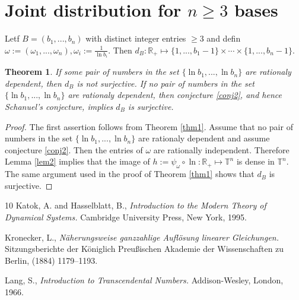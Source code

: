 \documentclass[14pt, twoside, a4paper]{article} %
\newtheorem{theo}{Theorem}                                                 %
\newtheorem{proof}{Proof}                                              %
\begin{document}
\section{Joint distribution for $n \geq 3$ bases}\label{sec4}
%
Letf $B = (b_1,...,b_n)$ with distinct integer entries $\geq 3$ 
and defin $\omega := (\omega_1,...,\omega_n), \omega_i := \frac{1}{\ln b_i}.$ Then 
%
$
d_B : \mathbb R_+ \mapsto \{1,...,b_1-1\} \times \cdots \times \{1,...,b_n-1\}.
$
%
\begin{theo}\label{thm2}
If some pair of numbers in the set $\{\ln b_1,...,\ln b_n\}$ 
are rationaly dependent, then  $d_B$ is not surjective. 
If no pair of numbers in the set $\{\ln b_1,...,\ln b_n\}$ 
are rationaly dependent, then 
conjecture \ref{conj2}, and hence  Schanuel's conjecture, implies $d_B$ is surjective.
\end{theo}
\begin{proof}
The first assertion follows from Theorem \ref{thm1}. Assume that no pair of numbers in the set 
$\{\ln b_1,...,\ln b_n\}$ 
are rationaly dependent and assume conjecture \ref{conj2}. 
Then the entries of 
$\omega$ are rationally independent. Therefore 
Lemma \ref{lem2} implies that the image of
$h := \psi_\omega \circ \ln : \mathbb R_+ 
\mapsto \mathbb T^n$ is dense in 
$\mathbb T^n.$ 
The same argument used in the proof
of Theorem \ref{thm1} shows that
$d_B$ is surjective.
\end{proof}
%
\begin{thebibliography}{10}
 Katok, A. and 
Hasselblatt, B., {\it Introduction to the Modern Theory of Dynamical Systems.} Cambridge University Press, New York, 1995.

 Kronecker, L., 
{\it N\"{a}herungsweise ganzzahlige Aufl\"{o}sung linearer Gleichungen.} Sitzungsberichte der K\"{o}niglich Preußischen Akademie der Wissenschaften zu Berlin, (1884) 1179--1193.

 Lang, S., {\it Introduction to Transcendental Numbers.} Addison-Wesley, London, 1966.
\end{thebibliography}
\end{document}
